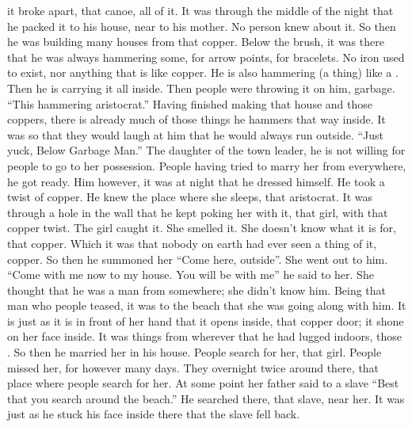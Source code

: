 \begin{pairs}
\begin{Rightside}
it broke apart, that canoe, all of it.
It was through the middle of the night that he packed it to his house, near to his mother.
No person knew about it.
\pend
\pstart
{}So then he was building many houses from that copper.
Below the brush, it was there that he was always hammering some, for arrow points, for bracelets.
No iron used to exist, nor anything that is like copper.
He is also hammering (a thing) like a .
Then he is carrying it all inside.
Then people were throwing it on him, garbage.
“This hammering aristocrat.”
Having finished making that house and those coppers, there is already much of those things he hammers that way inside.
It was so that they would laugh at him that he would always run outside.
“Just yuck, Below Garbage Man.”
\pend
\pstart
{}The daughter of the town leader, he is not willing for people to go to her possession.
People having tried to marry her from everywhere, he got ready.
Him however, it was at night that he dressed himself.
He took a twist of copper.
He knew the place where she sleeps, that aristocrat.
It was through a hole in the wall that he kept poking her with it, that girl, with that copper twist.
The girl caught it.
She smelled it.
She doesn’t know what it is for, that copper.
Which it was that nobody on earth had ever seen a thing of it, copper.
So then he summoned her “Come here, outside”.
She went out to him.
\qqk{}“Come with me now to my house.
You will be with me”
he said to her.
She thought that he was a man from somewhere;
she didn’t know him.
Being that man who people teased, it was to the beach that she was going along with him.
It is just as it is in front of her hand that it opens inside, that copper door;
it shone on her face inside.
It was things from wherever that he had lugged indoors, those .
So then he married her in his house.
\pend
\pstart
{}People search for her, that girl.
People missed her, for however many days.
They overnight twice around there, that place where people search for her.
At some point her father said to a slave
“Best that you search around the beach.”
He searched there, that slave, near her.
It was just as he stuck his face inside there that the slave fell back.

\end{Rightside}
\end{pairs}
